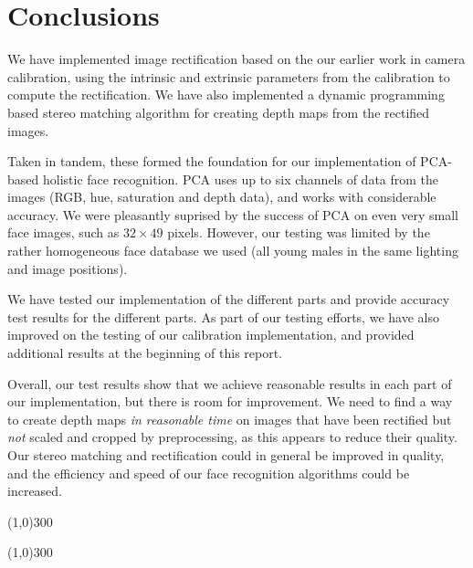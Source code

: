 
\section{Conclusions}
\label{sec:conclusions}
We have implemented image rectification based on the our earlier work
in camera calibration, using the intrinsic and extrinsic parameters from the
calibration to compute the rectification. We have also implemented a
dynamic programming based stereo matching algorithm for creating depth maps from
the rectified images.

Taken in tandem, these formed the foundation for our
implementation of PCA-based holistic face
recognition. PCA uses up to six channels of data from the images (RGB, hue,
saturation and depth data), and works with considerable accuracy. We were pleasantly
suprised by the success of PCA on even very small face images, such as $32\times49$ pixels. However, our testing
was limited by the rather homogeneous face database we used (all young males in the
same lighting and image positions).

We have tested our implementation of the different parts and provide accuracy
test results for the different parts. As part of our testing efforts, we have
also improved on the testing of our calibration implementation, and provided
additional results at the beginning of this report.

Overall, our test results show that we achieve reasonable results in each part of our
implementation, but there is room for improvement. We need to find a way to create depth maps
\emph{in reasonable time} on images that have been rectified but \emph{not} scaled and cropped
by preprocessing, as this appears to reduce their quality. Our stereo matching and rectification could in general be improved in quality, and the efficiency and speed of our face recognition algorithms could be increased.

\begin{center}
\line(1,0){300}

\line(1,0){300}
\end{center}
